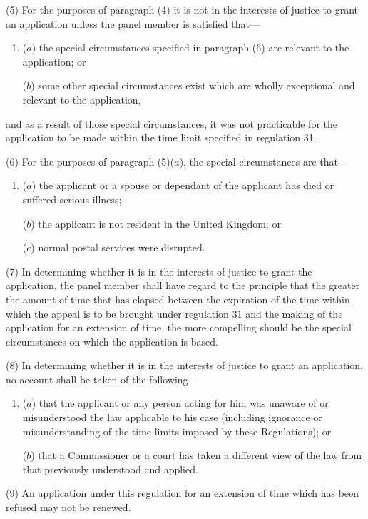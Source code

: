 \documentclass[12pt,a4paper]{article}
\begin{document}
(5) For the purposes of paragraph (4) it is not in the interests of justice to grant an application unless the panel member is satisfied that—
\begin{enumerate}\item[]
($a$) the special circumstances specified in paragraph (6) are relevant to the application; or

($b$) some other special circumstances exist which are wholly exceptional and relevant to the application,
\end{enumerate}
and as a result of those special circumstances, it was not practicable for the application to be made within the time limit specified in regulation 31.

(6) For the purposes of paragraph (5)($a$), the special circumstances are that—
\begin{enumerate}\item[]
($a$) the applicant or a spouse or dependant of the applicant has died or suffered serious illness;

($b$) the applicant is not resident in the United Kingdom; or

($c$) normal postal services were disrupted.
\end{enumerate}

(7) In determining whether it is in the interests of justice to grant the application, the panel member shall have regard to the principle that the greater the amount of time that has elapsed between the expiration of the time within which the appeal is to be brought under regulation 31 and the making of the application for an extension of time, the more compelling should be the special circumstances on which the application is based.

(8) In determining whether it is in the interests of justice to grant an application, no account shall be taken of the following—
\begin{enumerate}\item[]
($a$) that the applicant or any person acting for him was unaware of or misunderstood the law applicable to his case (including ignorance or misunderstanding of the time limits imposed by these Regulations); or

($b$) that a Commissioner or a court has taken a different view of the law from that previously understood and applied.
\end{enumerate}

(9) An application under this regulation for an extension of time which has been refused may not be renewed.
\end{document}
